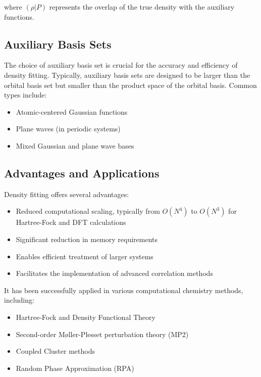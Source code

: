 where $(\rho|P)$ represents the overlap of the true density with the auxiliary functions.

\subsection{Auxiliary Basis Sets}

The choice of auxiliary basis set is crucial for the accuracy and efficiency of density fitting. Typically, auxiliary basis sets are designed to be larger than the orbital basis set but smaller than the product space of the orbital basis. Common types include:

\begin{itemize}
    \item Atomic-centered Gaussian functions
    \item Plane waves (in periodic systems)
    \item Mixed Gaussian and plane wave bases
\end{itemize}

\subsection{Advantages and Applications}

Density fitting offers several advantages:

\begin{itemize}
    \item Reduced computational scaling, typically from $O(N^4)$ to $O(N^3)$ for Hartree-Fock and DFT calculations
    \item Significant reduction in memory requirements
    \item Enables efficient treatment of larger systems
    \item Facilitates the implementation of advanced correlation methods
\end{itemize}

It has been successfully applied in various computational chemistry methods, including:

\begin{itemize}
    \item Hartree-Fock and Density Functional Theory
    \item Second-order Møller-Plesset perturbation theory (MP2)
    \item Coupled Cluster methods
    \item Random Phase Approximation (RPA)
\end{itemize}

